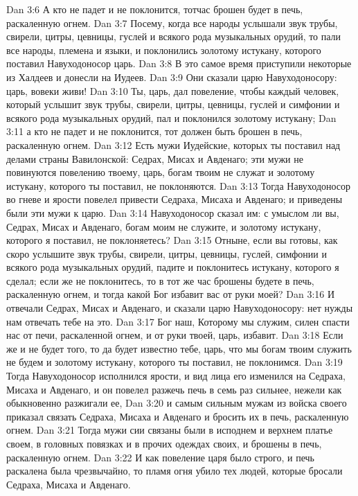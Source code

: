 Dan 3:6  А кто не падет и не поклонится, тотчас брошен будет в печь, раскаленную огнем.
Dan 3:7  Посему, когда все народы услышали звук трубы, свирели, цитры, цевницы, гуслей и всякого рода музыкальных орудий, то пали все народы, племена и языки, и поклонились золотому истукану, которого поставил Навуходоносор царь.
Dan 3:8  В это самое время приступили некоторые из Халдеев и донесли на Иудеев.
Dan 3:9  Они сказали царю Навуходоносору: царь, вовеки живи!
Dan 3:10  Ты, царь, дал повеление, чтобы каждый человек, который услышит звук трубы, свирели, цитры, цевницы, гуслей и симфонии и всякого рода музыкальных орудий, пал и поклонился золотому истукану;
Dan 3:11  а кто не падет и не поклонится, тот должен быть брошен в печь, раскаленную огнем.
Dan 3:12  Есть мужи Иудейские, которых ты поставил над делами страны Вавилонской: Седрах, Мисах и Авденаго; эти мужи не повинуются повелению твоему, царь, богам твоим не служат и золотому истукану, которого ты поставил, не поклоняются.
Dan 3:13  Тогда Навуходоносор во гневе и ярости повелел привести Седраха, Мисаха и Авденаго; и приведены были эти мужи к царю.
Dan 3:14  Навуходоносор сказал им: с умыслом ли вы, Седрах, Мисах и Авденаго, богам моим не служите, и золотому истукану, которого я поставил, не поклоняетесь?
Dan 3:15  Отныне, если вы готовы, как скоро услышите звук трубы, свирели, цитры, цевницы, гуслей, симфонии и всякого рода музыкальных орудий, падите и поклонитесь истукану, которого я сделал; если же не поклонитесь, то в тот же час брошены будете в печь, раскаленную огнем, и тогда какой Бог избавит вас от руки моей?
Dan 3:16  И отвечали Седрах, Мисах и Авденаго, и сказали царю Навуходоносору: нет нужды нам отвечать тебе на это.
Dan 3:17  Бог наш, Которому мы служим, силен спасти нас от печи, раскаленной огнем, и от руки твоей, царь, избавит.
Dan 3:18  Если же и не будет того, то да будет известно тебе, царь, что мы богам твоим служить не будем и золотому истукану, которого ты поставил, не поклонимся.
Dan 3:19  Тогда Навуходоносор исполнился ярости, и вид лица его изменился на Седраха, Мисаха и Авденаго, и он повелел разжечь печь в семь раз сильнее, нежели как обыкновенно разжигали ее,
Dan 3:20  и самым сильным мужам из войска своего приказал связать Седраха, Мисаха и Авденаго и бросить их в печь, раскаленную огнем.
Dan 3:21  Тогда мужи сии связаны были в исподнем и верхнем платье своем, в головных повязках и в прочих одеждах своих, и брошены в печь, раскаленную огнем.
Dan 3:22  И как повеление царя было строго, и печь раскалена была чрезвычайно, то пламя огня убило тех людей, которые бросали Седраха, Мисаха и Авденаго.
